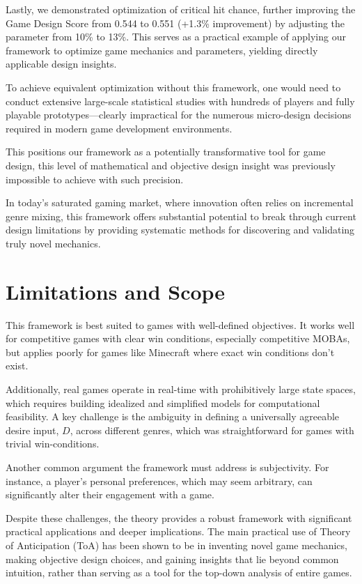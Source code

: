 \documentclass[manuscript,review,anonymous]{acmart}
\theoremstyle{definition}
\theoremstyle{plain}
\begin{document}
Lastly, we demonstrated optimization of critical hit chance, further improving the Game Design Score from 0.544 to 0.551 (+1.3\% improvement) by adjusting the parameter from 10\% to 13\%.
This serves as a practical example of applying our framework to optimize game mechanics and parameters, yielding directly applicable design insights.

To achieve equivalent optimization without this framework, one would need to conduct extensive large-scale statistical studies with hundreds of players and fully playable prototypes---clearly impractical for the numerous micro-design decisions required in modern game development environments.

This positions our framework as a potentially transformative tool for game design, this level of mathematical and objective design insight was previously impossible to achieve with such precision.

In today's saturated gaming market, where innovation often relies on incremental genre mixing, this framework offers substantial potential to break through current design limitations by providing systematic methods for discovering and validating truly novel mechanics.

\section{Limitations and Scope}
This framework is best suited to games with well-defined objectives.
It works well for competitive games with clear win conditions, especially competitive MOBAs, but applies poorly for games like Minecraft where exact win conditions don't exist.

Additionally, real games operate in real-time with prohibitively large state spaces, which requires building idealized and simplified models for computational feasibility.
A key challenge is the ambiguity in defining a universally agreeable desire input, $D$, across different genres, which was straightforward for games with trivial win-conditions.

Another common argument the framework must address is subjectivity.
For instance, a player's personal preferences, which may seem arbitrary, can significantly alter their engagement with a game.

Despite these challenges, the theory provides a robust framework with significant practical applications and deeper implications.
The main practical use of Theory of Anticipation (ToA) has been shown to be in inventing novel game mechanics, making objective design choices, and gaining insights that lie beyond common intuition, rather than serving as a tool for the top-down analysis of entire games.
\end{document}
